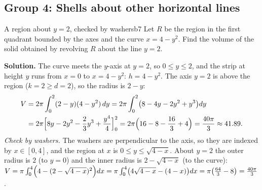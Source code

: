 \documentclass[11pt]{article}
\begin{document}
\subsection*{Group 4: Shells about other horizontal lines}

\begin{exmp}{A region about $y=2$, checked by washers}{b7}
Let $R$ be the region in the first quadrant bounded by the axes and the curve $x=4-y^2$. Find the volume of the solid obtained by revolving $R$ about the line $y=2$.

\textbf{Solution.} The curve meets the $y$-axis at $y=2$, so $0\le y\le2$, and the strip at height $y$ runs from $x=0$ to $x=4-y^2$: $h=4-y^2$. The axis $y=2$ is above the region ($k=2\ge d=2$), so the radius is $2-y$:
\[
\begin{aligned}V&=2\pi\int_0^2(2-y)(4-y^2)\,dy=2\pi\int_0^2\bigl(8-4y-2y^2+y^3\bigr)dy\\ &=2\pi\Bigl[8y-2y^2-\frac23y^3+\frac{y^4}4\Bigr]_0^2=2\pi\Bigl(16-8-\frac{16}3+4\Bigr)=\frac{40\pi}3\approx41.89 .
\end{aligned}
\]
\emph{Check by washers.} The washers are perpendicular to the axis, so they are indexed by $x\in[0,4]$, and the region at $x$ is $0\le y\le\sqrt{4-x}$. About $y=2$ the outer radius is $2$ (to $y=0$) and the inner radius is $2-\sqrt{4-x}$ (to the curve): $V=\pi\int_0^4\Bigl(4-(2-\sqrt{4-x})^2\Bigr)dx=\pi\int_0^4\bigl(4\sqrt{4-x}-(4-x)\bigr)dx=\pi\bigl(\frac{64}3-8\bigr)=\frac{40\pi}3$.
\begin{center}
\end{center}
\end{exmp}
\end{document}
